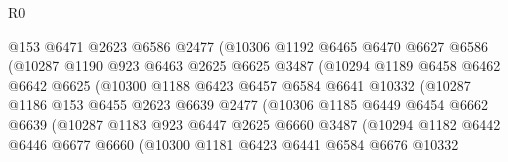 \begin{lexlean}{R0}
\begin{coremodule}
                          @153
                          @6471
                          @2623
                          @6586
                          @2477
                          (@10306
                            @1192
                            @6465
                            @6470
                            @6627
                            @6586
                            (@10287
                              @1190
                              @923
                              @6463
                              @2625
                              @6625
                              @3487
                              (@10294
                                @1189
                                @6458
                                @6462
                                @6642
                                @6625
                                (@10300
                                  @1188
                                  @6423
                                  @6457
                                  @6584
                                  @6641
                                  @10332
                                  (@10287
                                    @1186
                                    @153
                                    @6455
                                    @2623
                                    @6639
                                    @2477
                                    (@10306
                                      @1185
                                      @6449
                                      @6454
                                      @6662
                                      @6639
                                      (@10287
                                        @1183
                                        @923
                                        @6447
                                        @2625
                                        @6660
                                        @3487
                                        (@10294
                                          @1182
                                          @6442
                                          @6446
                                          @6677
                                          @6660
                                          (@10300
                                            @1181
                                            @6423
                                            @6441
                                            @6584
                                            @6676
                                            @10332

\end{coremodule}
\end{lexlean}
